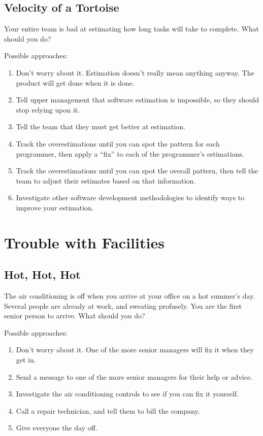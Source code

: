 \subsection{Velocity of a Tortoise}

Your entire team is bad at estimating how long tasks will take to complete. What should you do?

Possible approaches:

\begin{enumerate}
\item Don't worry about it. Estimation doesn't really mean anything anyway. The product will get done when it is done.
\item Tell upper management that software estimation is impossible, so they should stop relying upon it.
\item Tell the team that they must get better at estimation.
\item Track the overestimations until you can spot the pattern for each programmer, then apply a ``fix'' to each of the programmer's estimations.
\item Track the overestimations until you can spot the overall pattern, then tell the team to adjust their estimates based on that information.
\item Investigate other software development methodologies to identify ways to improve your estimation.
\end{enumerate}


\section{Trouble with Facilities}

\subsection{Hot, Hot, Hot}

The air conditioning is off when you arrive at your office on a hot summer's day. Several people are already at work, and sweating profusely. You are the first senior person to arrive. What should you do?

Possible approaches:

\begin{enumerate}
\item Don't worry about it. One of the more senior managers will fix it when they get in.
\item Send a message to one of the more senior managers for their help or advice.
\item Investigate the air conditioning controls to see if you can fix it yourself.
\item Call a repair technician, and tell them to bill the company.
\item Give everyone the day off.
\end{enumerate}

